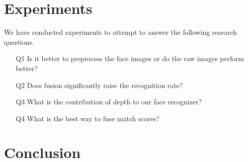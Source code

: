 \documentclass[]{article}
\begin{document}
\section{Experiments}
\graphicspath{{img/experiments/}}
We have conducted experiments to attempt to answer the following research questions.
\begin{itemize}
	\item[Q1] Is it better to preprocess the face images or do the raw images perform better?
	\item[Q2] Does fusion significantly raise the recognition rate?
	\item[Q3] What is the contribution of depth to our face recognizer?
	\item[Q4] What is the best way to fuse match scores?
\end{itemize}


\section{Conclusion}


\end{document}
